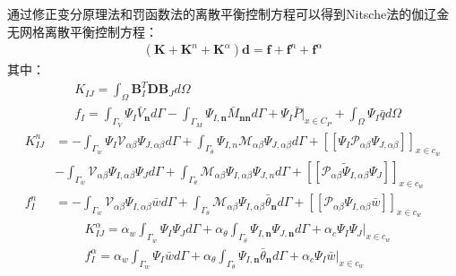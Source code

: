 通过修正变分原理法和罚函数法的离散平衡控制方程可以得到Nitsche法的伽辽金无网格离散平衡控制方程：
\begin{equation}
\begin{split}
    (\pmb{K}+\pmb{K}^n+\pmb{K}^{\alpha})\pmb{d}=\pmb{f}+\pmb{f}^n+\pmb{f}^{\alpha}
\end{split}
\end{equation}
其中：
\begin{equation}
\begin{split}
    &K_{IJ}=\int_{\Omega}\pmb{B}^T_I\pmb{D}\pmb{B}_Jd\Omega\\
    &f_I=\int_{\Gamma_V}\Psi_I\bar{V}_{\pmb{n}}d\Gamma-\int_{\Gamma_M}\Psi_{I,\pmb{n}}\bar{M}_{\pmb{nn}}d\Gamma+\Psi_I\bar{P}\vert_{x\in C_P}+\int_{\Omega}\Psi_I\bar{q}d\Omega
\end{split}
\end{equation}
\begin{equation}
\begin{split}
     K^n_{IJ}&=-\int_{\Gamma_w}\Psi_I\mathcal{V}_{\alpha\beta}\Psi_{J,\alpha\beta}d\Gamma+\int_{\Gamma_{\theta}}\Psi_{I,n}\mathcal{M}_{\alpha\beta}\Psi_{J,\alpha\beta}d\Gamma+[[\Psi_I\mathcal{P}_{\alpha\beta}\Psi_{J,\alpha\beta}]]_{x\in{c_w}}\\
     &-\int_{\Gamma_w}\mathcal{V}_{\alpha\beta}\Psi_{I,\alpha\beta}\Psi_Jd\Gamma+\int_{\Gamma_{\theta}}\mathcal{M}_{\alpha\beta}\Psi_{I,\alpha\beta}\Psi_{J,n}d\Gamma+[[\mathcal{P}_{\alpha\beta}\tilde{\Psi}_{I,\alpha\beta}\Psi_J]]_{x\in{c_w}}\\
     f_{I}^n&=-\int_{\Gamma_w}\mathcal{V}_{\alpha\beta}\Psi_{I,\alpha\beta}\bar{w}d\Gamma+\int_{\Gamma_{\theta}}\mathcal{M}_{\alpha\beta}\Psi_{I,\alpha\beta}\bar{\theta}_{\pmb n}d\Gamma+[[\mathcal{P}_{\alpha\beta}\Psi_{I,\alpha\beta}\bar{w}]]_{x\in{c_w}}
\end{split}
\end{equation}
\begin{equation}
\begin{split}
   &K^{\alpha}_{IJ}=\alpha_w\int_{\Gamma_w}\Psi_I\Psi_Jd\Gamma+\alpha_{\theta}\int_{\Gamma_{\theta}}\Psi_{I,\pmb n}\Psi_{J,\pmb n}d\Gamma+\alpha_c\Psi_I\Psi_J\vert_{x\in c_w}\\
&f^{\alpha}_I=\alpha_w\int_{\Gamma_w}\Psi_I\bar{w}d\Gamma+\alpha_{\theta}\int_{\Gamma_{\theta}}\Psi_{I,\pmb n}\bar{\theta}_{\pmb n}d\Gamma+\alpha_c\Psi_I\bar{w}\vert_{x\in c_w}
\end{split}
\end{equation}\par
